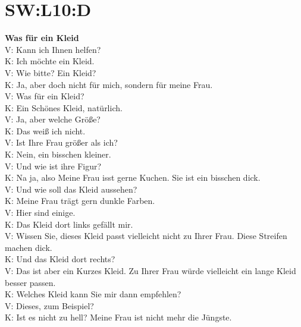 \section{SW:L10:D}
\noindent
\textbf{Was für ein Kleid} \\
V: Kann ich Ihnen helfen? \\
K: Ich möchte ein Kleid. \\
V: Wie bitte? Ein Kleid? \\
K: Ja, aber doch nicht für mich, sondern für meine Frau. \\
V: Was für ein Kleid? \\
K: Ein Schönes Kleid, natürlich. \\
V: Ja, aber welche Größe? \\
K: Das weiß ich nicht. \\
V: Ist Ihre Frau größer als ich? \\
K: Nein, ein bisschen kleiner. \\
V: Und wie ist ihre Figur?  \\
K: Na ja, also Meine Frau isst gerne Kuchen. Sie ist ein bisschen dick. \\
V: Und wie soll das Kleid aussehen?  \\
K: Meine Frau trägt gern dunkle Farben.  \\
V: Hier sind einige.  \\
K: Das Kleid dort links gefällt mir. \\
V: Wissen Sie, dieses Kleid passt vielleicht nicht zu Ihrer Frau. Diese Streifen machen dick.  \\
K: Und das Kleid dort rechts? \\
V: Das ist aber ein Kurzes Kleid. Zu Ihrer Frau würde vielleicht ein lange Kleid besser passen. \\
K: Welches Kleid kann Sie mir dann empfehlen?  \\
V: Dieses, zum Beispiel? \\
K: Ist es nicht zu hell? Meine Frau ist nicht mehr die Jüngste.  \\
